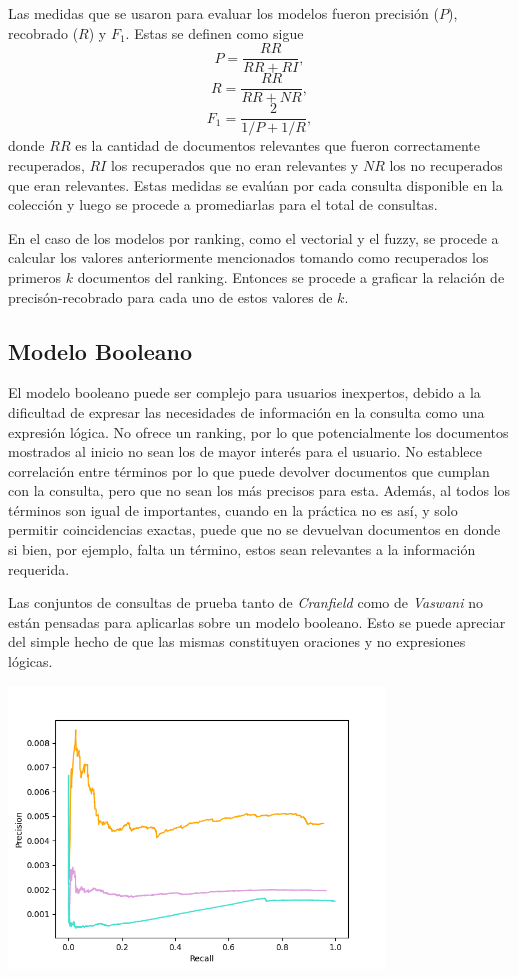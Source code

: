 \documentclass{llncs}
\begin{document}
	Las medidas que se usaron para evaluar los modelos fueron precisi\'on ($P$), recobrado ($R$) y $F_1$. Estas se definen como sigue
	\[
	P = \frac{RR}{RR + RI},
	\]
	\[
	R = \frac{RR}{RR + NR},
	\]
	\[
	F_1 = \frac{2}{1/P + 1/R},
	\]
	donde $RR$ es la cantidad de documentos relevantes que fueron correctamente recuperados, $RI$ los recuperados que no eran relevantes y $NR$ los no recuperados que eran relevantes. Estas medidas se eval\'uan por cada consulta disponible en la colecci\'on y luego se procede a promediarlas para el total de consultas.
	
	En el caso de los modelos por ranking, como el vectorial y el fuzzy, se procede a calcular los valores anteriormente mencionados tomando como recuperados los primeros $k$ documentos del ranking. Entonces se procede a graficar la relaci\'on de precis\'on-recobrado para cada uno de estos valores de $k$.
	
	\subsection{Modelo Booleano}
	
	El modelo booleano puede ser complejo para usuarios inexpertos, debido a la dificultad de expresar las necesidades de informaci\'on en la consulta como una expresi\'on l\'ogica. No ofrece un ranking, por lo que potencialmente los documentos mostrados al inicio no sean los de mayor inter\'es para el usuario. No establece correlaci\'on entre t\'erminos por lo que puede devolver documentos que cumplan con la consulta, pero que no sean los m\'as precisos para esta. Adem\'as, al todos los t\'erminos son igual de importantes, cuando en la pr\'actica no es as\'i, y solo permitir coincidencias exactas, puede que no se devuelvan documentos en donde si bien, por ejemplo, falta un t\'ermino, estos sean relevantes a la informaci\'on requerida.
	
	Las conjuntos de consultas de prueba tanto de \emph{Cranfield} como de \emph{Vaswani} no est\'an pensadas para aplicarlas sobre un modelo booleano. Esto se puede apreciar del simple hecho de que las mismas constituyen oraciones y no expresiones l\'ogicas. 
	
	\begin{center}
		\includegraphics[width=10cm]{boolean}
	\end{center}
	
\end{document}
